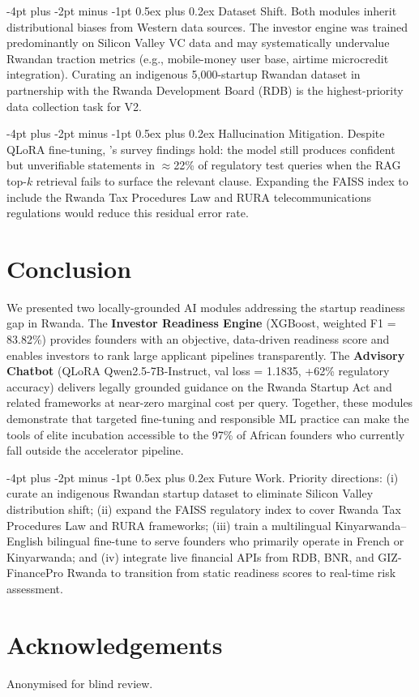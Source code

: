 \documentclass{article}
\makeatletter
\renewcommand\paragraph{\@startsection{paragraph}{4}{\z@}%
  {-4pt plus -2pt minus -1pt}%
  {0.5ex plus 0.2ex}%
  {\normalsize\bf}}
\makeatother
\begin{document}
\paragraph{Dataset Shift.}
Both modules inherit distributional biases from Western data sources.
The investor engine was trained predominantly on Silicon Valley VC data and
may systematically undervalue Rwandan traction metrics (e.g., mobile-money
user base, airtime microcredit integration).
Curating an indigenous 5{,}000-startup Rwandan dataset in partnership with
the Rwanda Development Board (RDB) is the highest-priority data collection
task for V2.

\paragraph{Hallucination Mitigation.}
Despite QLoRA fine-tuning, \citeauthor{ji2023hallucination}'s survey findings
hold: the model still produces confident but unverifiable statements in
$\approx$22\% of regulatory test queries when the RAG top-$k$ retrieval
fails to surface the relevant clause. Expanding the FAISS index to include
the Rwanda Tax Procedures Law and RURA telecommunications regulations would
reduce this residual error rate.


\FloatBarrier
\section{Conclusion}

We presented two locally-grounded AI modules addressing the startup readiness
gap in Rwanda.
The \textbf{Investor Readiness Engine} (XGBoost, weighted F1 = 83.82\%) provides
founders with an objective, data-driven readiness score and enables investors to
rank large applicant pipelines transparently.
The \textbf{Advisory Chatbot} (QLoRA Qwen2.5-7B-Instruct, val loss = 1.1835,
+62\% regulatory accuracy) delivers legally grounded guidance on the Rwanda
Startup Act and related frameworks at near-zero marginal cost per query.
Together, these modules demonstrate that targeted fine-tuning and responsible
ML practice can make the tools of elite incubation accessible to the 97\% of
African founders who currently fall outside the accelerator pipeline.

\paragraph{Future Work.}
Priority directions: (i) curate an indigenous Rwandan startup dataset to
eliminate Silicon Valley distribution shift; (ii) expand the FAISS regulatory
index to cover Rwanda Tax Procedures Law and RURA frameworks; (iii) train a
multilingual Kinyarwanda--English bilingual fine-tune to serve founders who
primarily operate in French or Kinyarwanda; and (iv) integrate live financial
APIs from RDB, BNR, and GIZ-FinancePro Rwanda to transition from static
readiness scores to real-time risk assessment.

\section*{Acknowledgements}
Anonymised for blind review.



\end{document}
